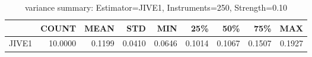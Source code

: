 \begin{table}[ht]
\centering
\caption{variance summary: Estimator=JIVE1, Instruments=250, Strength=0.10}
\begin{tabular}{lrrrrrrrr}
\toprule
 & COUNT & MEAN & STD & MIN & 25\% & 50\% & 75\% & MAX \\
\midrule
JIVE1 & 10.0000 & 0.1199 & 0.0410 & 0.0646 & 0.1014 & 0.1067 & 0.1507 & 0.1927 \\
\bottomrule
\end{tabular}
\end{table}
